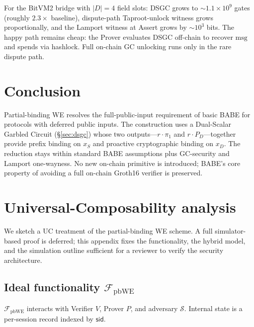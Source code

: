 \documentclass[11pt]{article}
\newcommand{\msg}{\mathrm{msg}}
\begin{document}
For the BitVM2 bridge with $|D| = 4$ field slots: DSGC grows to
$\sim\!1.1 \times 10^9$ gates (roughly $2.3\times$ baseline),
dispute-path Taproot-unlock witness grows proportionally, and the
Lamport witness at Assert grows by $\sim\!10^3$ bits. The happy path
remains cheap: the Prover evaluates DSGC off-chain to recover $\msg$
and spends via hashlock. Full on-chain GC unlocking runs only in the
rare dispute path.

\section{Conclusion}

Partial-binding WE resolves the full-public-input requirement of
basic BABE for protocols with deferred public inputs. The
construction uses a Dual-Scalar Garbled Circuit (\S\ref{sec:dsgc})
whose two outputs---$r \cdot \pi_1$ and $r \cdot P_D$---together
provide prefix binding on $x_S$ and proactive cryptographic binding
on $x_D$. The reduction stays within standard BABE assumptions plus
GC-security and Lamport one-wayness. No new on-chain primitive is
introduced; BABE's core property of avoiding a full on-chain Groth16
verifier is preserved.

\appendix
\section{Universal-Composability analysis}\label{app:uc}

We sketch a UC treatment of the partial-binding WE scheme. A full
simulator-based proof is deferred; this appendix fixes the
functionality, the hybrid model, and the simulation outline
sufficient for a reviewer to verify the security architecture.

\subsection{Ideal functionality $\mathcal{F}_{\mathrm{pbWE}}$}

$\mathcal{F}_{\mathrm{pbWE}}$ interacts with Verifier $V$,
Prover $P$, and adversary $\mathcal{S}$. Internal state is a
per-session record indexed by $\mathsf{sid}$.
\end{document}
